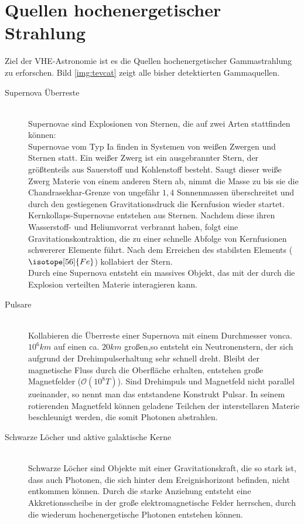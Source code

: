\section{Quellen hochenergetischer Strahlung}
Ziel der VHE-Astronomie ist es die Quellen hochenergetischer Gammastrahlung zu erforschen. Bild \ref{img:tevcat} zeigt alle bisher detektierten Gammaquellen.
\begin{description}
\item[Supernova Überreste]\hfill \\
Supernovae sind Explosionen von Sternen, die auf zwei Arten stattfinden können:\\Supernovae vom Typ Ia finden in Systemen von weißen Zwergen und Sternen statt. Ein weißer Zwerg ist ein ausgebrannter Stern, der größtenteils aus Sauerstoff und Kohlenstoff besteht. Saugt dieser weiße Zwerg Materie von einem anderen Stern ab, nimmt die Masse zu bis sie die Chandrasekhar-Grenze von ungefähr $1,4$ Sonnenmassen \cite{Grupen} überschreitet und durch den gestiegenen Gravitationsdruck die Kernfusion wieder startet.\\Kernkollaps-Supernovae entstehen aus Sternen. Nachdem diese ihren Wasserstoff- und Heliumvorrat verbrannt haben, folgt eine Gravitationskontraktion, die zu einer schnelle Abfolge von Kernfusionen schwererer Elemente führt. Nach dem Erreichen des stabilsten Elements ($\isotope[56]{Fe}$) kollabiert der Stern.\\Durch eine Supernova entsteht ein massives Objekt, das mit der durch die Explosion verteilten Materie interagieren kann.
\item[Pulsare]\hfill \\
Kollabieren die Überreste einer Supernova mit einem Durchmesser vonca. $10^6\unit{km}$ auf einen ca. $20\unit{km}$ großen,so entsteht ein Neutronenstern, der sich aufgrund der Drehimpulserhaltung sehr schnell dreht. Bleibt der magnetische Fluss durch die Oberfläche erhalten, entstehen große Magnetfelder ($\mathcal{O}(10^8\unit{T})$\cite{Grupen}). Sind Drehimpuls und Magnetfeld nicht parallel zueinander, so nennt man das entstandene Konstrukt Pulsar. In seinem rotierenden Magnetfeld können geladene Teilchen der interstellaren Materie beschleunigt werden, die somit Photonen abstrahlen.
\item[Schwarze Löcher und aktive galaktische Kerne]\hfill \\
Schwarze Löcher sind Objekte mit einer Gravitationskraft, die so stark ist, dass auch Photonen, die sich hinter dem Ereignishorizont befinden, nicht entkommen können. Durch die starke Anziehung entsteht eine Akkretionsscheibe in der große elektromagnetische Felder herrschen, durch die wiederum hochenergetische Photonen entstehen können.

\end{description}
